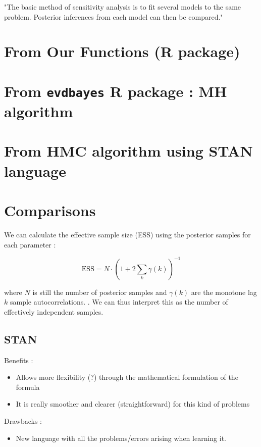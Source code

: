 \documentclass[11pt,a4paper,openany ]{book}
\begin{document}
"The basic method of sensitivity analysis is to fit several models to
the same problem. Posterior inferences from each model can then be compared."
\section{From Our Functions (R package)}


\section{From \texttt{evdbayes} R package : MH algorithm}



\section{From HMC algorithm using STAN language}




\section{Comparisons}

\citet{hartmann_bayesian_2016}
We can calculate the effective sample size (ESS) using the posterior samples for each parameter : 

\begin{equation}
\text{ESS}=N\cdot (1+2\sum_k\gamma(k))^{-1}
\end{equation}

where $N$ is still the number of posterior samples and $\gamma(k)$ are the monotone lag $k$ sample autocorrelations. \citet{geyer__1992}. We can thus interpret this as the number of effectively independent samples. 


\subsection{STAN}

Benefits : 

\begin{itemize}
	\item Allows more flexibility (?) through the mathematical formulation of the formula
	\item It is really smoother and clearer (straightforward) for this kind of problems 
\end{itemize}

Drawbacks : 

\begin{itemize}
	\item New language with all the problems/errors arising when learning it. 
\end{itemize}
\end{document}

